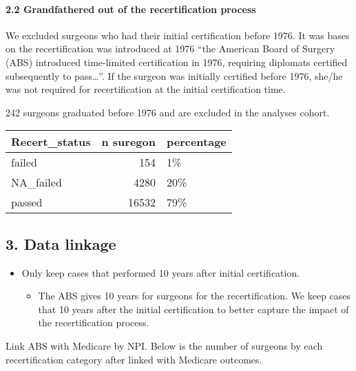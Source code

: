 \documentclass[
]{article}
\providecommand{\tightlist}{%
  \setlength{\itemsep}{0pt}\setlength{\parskip}{0pt}}
\begin{document}
\hypertarget{grandfathered-out-of-the-recertification-process}{%
\paragraph{2.2 Grandfathered out of the recertification
process}\label{grandfathered-out-of-the-recertification-process}}

We excluded surgeons who had their initial certification before 1976. It
was bases on the recertification was introduced at 1976 ``the American
Board of Surgery (ABS) introduced time-limited certification in 1976,
requiring diplomats certified subsequently to pass\ldots{}''. If the
surgeon was initially certified before 1976, she/he was not required for
recertification at the initial certification time.

242 surgeons graduated before 1976 and are excluded in the analyses
cohort.

\begin{table}[H]
\centering
\begin{tabular}{l|r|l}
\hline
Recert\_status & n suregon & percentage\\
\hline
failed & 154 & 1\%\\
\hline
NA\_failed & 4280 & 20\%\\
\hline
passed & 16532 & 79\%\\
\hline
\end{tabular}
\end{table}

\hypertarget{data-linkage}{%
\subsection{3. Data linkage}\label{data-linkage}}

\begin{itemize}
\tightlist
\item
  Only keep cases that performed 10 years after initial certification.

  \begin{itemize}
  \tightlist
  \item
    The ABS gives 10 years for surgeons for the recertification. We keep
    cases that 10 years after the initial certification to better
    capture the impact of the recertification process.
  \end{itemize}
\end{itemize}

Link ABS with Medicare by NPI. Below is the number of surgeons by each
recertification category after linked with Medicare outcomes.
\end{document}
